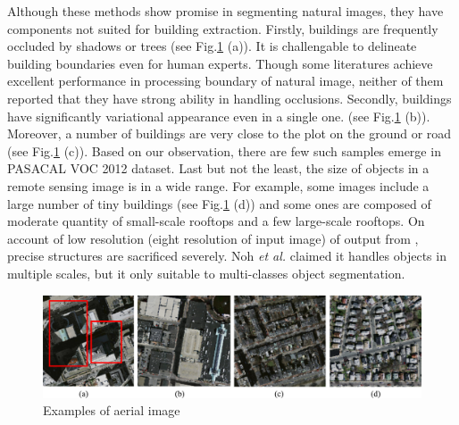 \documentclass[runningheads]{llncs}
\begin{document}
   Although these methods show promise in segmenting natural images, they have components not suited for building extraction. Firstly, buildings are frequently occluded by shadows or trees (see Fig.\ref{fig:AerialImages} (a)). It is challengable to delineate building boundaries even for human experts. Though some literatures\cite{chen14semantic,Zheng2015Conditional} achieve excellent performance in processing boundary of natural image, neither of them reported that they have strong ability in handling occlusions. Secondly, buildings have significantly variational appearance even in a single one. (see Fig.\ref{fig:AerialImages} (b)). Moreover, a number of buildings are very close to the plot on the ground or road (see Fig.\ref{fig:AerialImages} (c)). Based on our observation, there are few such samples emerge in PASACAL VOC 2012 dataset. Last but not the least, the size of objects in a remote sensing image is in a wide range. For example, some images include a large number of tiny buildings (see Fig.\ref{fig:AerialImages} (d)) and some ones are composed of moderate quantity of small-scale rooftops and a few  large-scale rooftops. On account of low resolution (eight resolution of input image) of output from \cite{Long2014Fully}, precise structures are sacrificed severely. Noh \textit{et al.} \cite{Noh2015Learning} claimed  it handles objects in multiple scales, but it only suitable to multi-classes object segmentation. 


\begin{figure}
\centering
\label{fig:AerialImages}
\includegraphics[width=120mm]{AerialImages}
\caption{Examples of aerial image}
\end{figure}      
            
\end{document}
